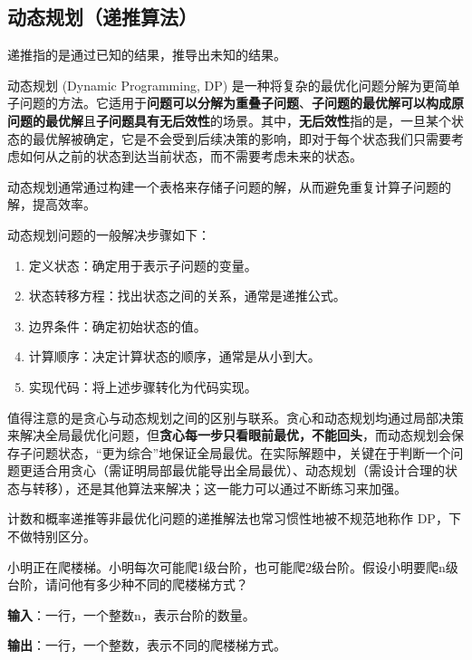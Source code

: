 \documentclass{article}
\begin{document}
\subsection{动态规划（递推算法）}

递推指的是通过已知的结果，推导出未知的结果。

动态规划 (Dynamic Programming, DP) 是一种将复杂的最优化问题分解为更简单子问题的方法。它适用于\textbf{问题可以分解为重叠子问题}、\textbf{子问题的最优解可以构成原问题的最优解}且\textbf{子问题具有无后效性}的场景。其中，\textbf{无后效性}指的是，一旦某个状态的最优解被确定，它是不会受到后续决策的影响，即对于每个状态我们只需要考虑如何从之前的状态到达当前状态，而不需要考虑未来的状态。

动态规划通常通过构建一个表格来存储子问题的解，从而避免重复计算子问题的解，提高效率。

动态规划问题的一般解决步骤如下：
\begin{enumerate}
  \item 定义状态：确定用于表示子问题的变量。
  \item 状态转移方程：找出状态之间的关系，通常是递推公式。
  \item 边界条件：确定初始状态的值。
  \item 计算顺序：决定计算状态的顺序，通常是从小到大。
  \item 实现代码：将上述步骤转化为代码实现。
\end{enumerate}

值得注意的是贪心与动态规划之间的区别与联系。贪心和动态规划均通过局部决策来解决全局最优化问题，但\textbf{贪心每一步只看眼前最优，不能回头}，而动态规划会保存子问题状态，“更为综合”地保证全局最优。在实际解题中，关键在于判断一个问题更适合用贪心（需证明局部最优能导出全局最优）、动态规划（需设计合理的状态与转移），还是其他算法来解决；这一能力可以通过不断练习来加强。

计数和概率递推等非最优化问题的递推解法也常习惯性地被不规范地称作 DP，下不做特别区分。

\begin{example}
  小明正在爬楼梯。小明每次可能爬1级台阶，也可能爬2级台阶。假设小明要爬n级台阶，请问他有多少种不同的爬楼梯方式？

  \textbf{输入}：一行，一个整数n，表示台阶的数量。

  \textbf{输出}：一行，一个整数，表示不同的爬楼梯方式。
\end{example}
\end{document}
